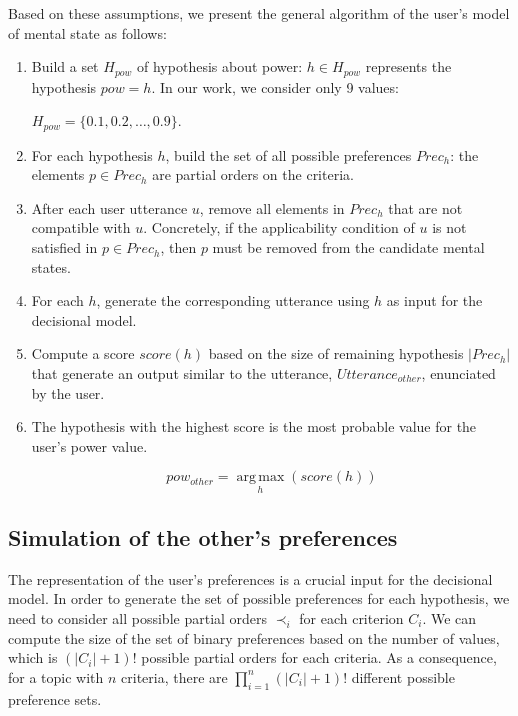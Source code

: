 \documentclass[conference, letterpaper]{IEEEtran}
\begin{document}
	Based on these assumptions, we present the general algorithm of the user's model of mental state as follows:
	\begin{enumerate}
		\item Build a set $H_{pow}$ of hypothesis about power: $h\in H_{pow}$ represents the hypothesis $pow=h$. In our work, we consider only 9 values: 
		
		$H_{pow}=\{0.1, 0.2, \ldots, 0.9\}$.
		\item For each hypothesis $h$, build the set of all possible preferences $Prec_h$: the elements $p\in Prec_h$ are partial orders on the criteria.
		\item After each user utterance $u$, remove all elements in $Prec_h$ that are not compatible with $u$. Concretely, if the applicability condition of $u$ is not satisfied in $p\in Prec_h$, then $p$ must be removed from the candidate mental states.
		\item For each $h$, generate the corresponding utterance using $h$ as input for the decisional model.
		\item Compute a score $score(h)$ based on the size of remaining hypothesis $|Prec_h|$ that generate an output similar to the utterance, $Utterance_{other}$, enunciated by the user. 
		\item 	The hypothesis with the highest score is the most probable value for the user's power value.

		\begin{equation}
		pow_{other} = \operatorname*{arg\,max}_{h} (score(h))
		\end{equation}
		
	\end{enumerate}
		
	
	\subsection*{Simulation of the other's preferences}
	
		The representation of the user's preferences is a crucial input for the decisional model. In order to generate the set of possible preferences for each hypothesis, we need to consider all possible partial orders $\prec_i$ for each criterion $C_i$. 
		We can compute the size of the set of binary preferences based on the number of values, which is $(|C_i| + 1)!$ possible partial orders for each criteria. As a consequence, for a topic with $n$ criteria, there are $\prod_{i=1}^n (|C_i|+1)!$ different possible preference sets.
	
\end{document}
